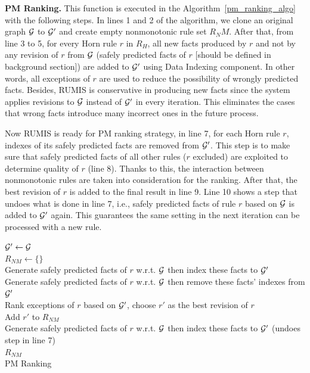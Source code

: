 \textbf{PM Ranking.} This function is executed in the Algorithm~\ref{pm_ranking_algo} with the following steps. In lines 1 and 2 of the algorithm, we clone an original graph $\mathcal{G}$ to $\mathcal{G}'$ and create empty nonmonotonic rule set $R_NM$. After that, from line 3 to 5, for every Horn rule $r$ in $R_H$, all new facts produced by $r$ and not by any revision of $r$ from $\mathcal{G}$ (safely predicted facts of $r$ [should be defined in background section]) are added to $\mathcal{G}'$ using Data Indexing component. In other words, all exceptions of $r$ are used to reduce the possibility of wrongly predicted facts. Besides, RUMIS is conservative in producing new facts since the system applies revisions to $\mathcal{G}$ instead of $\mathcal{G}'$ in every iteration. This eliminates the cases that wrong facts introduce many incorrect ones in the future process. 

Now RUMIS is ready for PM ranking strategy, in line 7, for each Horn rule $r$, indexes of its safely predicted facts are removed from $\mathcal{G}'$. This step is to make sure that safely predicted facts of all other rules ($r$ excluded) are exploited to determine quality of $r$ (line 8). Thanks to this, the interaction between nonmonotonic rules are taken into consideration for the ranking. After that, the best revision of $r$ is added to the final result in line 9. Line 10 shows a step that undoes what is done in line 7, i.e., safely predicted facts of rule $r$ based on $\mathcal{G}$ is added to $\mathcal{G}'$ again. This guarantees the same setting in the next iteration can be processed with a new rule.

\IncMargin{1.5em}
\begin{algorithm}[H]
\DontPrintSemicolon
\SetAlgoLined
{}
\BlankLine
$\mathcal{G}' \leftarrow \mathcal{G}$\\
$R_{NM} \leftarrow \{\}$\\
\BlankLine
{} {
	Generate safely predicted facts of $r$ w.r.t. $\mathcal{G}$ then index these facts to $\mathcal{G}'$\\
}
\BlankLine
{} {
	Generate safely predicted facts of $r$ w.r.t. $\mathcal{G}$ then remove these facts' indexes from $\mathcal{G}'$\\
	Rank exceptions of $r$ based on $\mathcal{G}'$, choose $r'$ as the best revision of $r$\\
	Add $r'$ to $R_{NM}$\\
	Generate safely predicted facts of $r$ w.r.t. $\mathcal{G}$ then index these facts to $\mathcal{G}'$ (undoes step in line 7)\\
}
\Return $R_{NM}$\\
\caption{PM Ranking}
\label{pm_ranking_algo}
\end{algorithm}
\DecMargin{1.5em}

